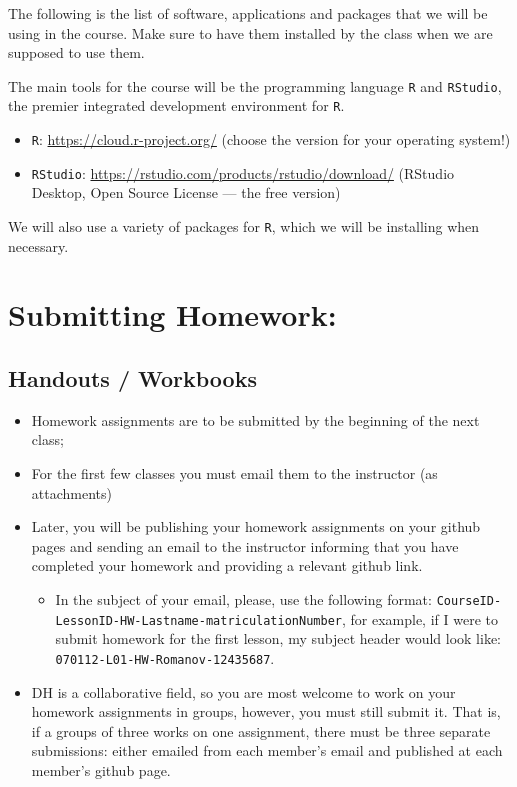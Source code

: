 \documentclass[
]{book}
\providecommand{\tightlist}{%
  \setlength{\itemsep}{0pt}\setlength{\parskip}{0pt}}
\begin{document}
The following is the list of software, applications and packages that we will be using in the course. Make sure to have them installed by the class when we are supposed to use them.

The main tools for the course will be the programming language \texttt{R} and \texttt{RStudio}, the premier integrated development environment for \texttt{R}.

\begin{itemize}
\tightlist
\item
  \texttt{R}: \url{https://cloud.r-project.org/} (choose the version for your operating system!)
\item
  \texttt{RStudio}: \url{https://rstudio.com/products/rstudio/download/} (RStudio Desktop, Open Source License --- the free version)
\end{itemize}

We will also use a variety of packages for \texttt{R}, which we will be installing when necessary.

\hypertarget{submitting-homework}{%
\section{Submitting Homework:}\label{submitting-homework}}

\hypertarget{handouts-workbooks}{%
\subsection{Handouts / Workbooks}\label{handouts-workbooks}}

\begin{itemize}
\tightlist
\item
  Homework assignments are to be submitted by the beginning of the next class;
\item
  For the first few classes you must email them to the instructor (as attachments)
\item
  Later, you will be publishing your homework assignments on your github pages and sending an email to the instructor informing that you have completed your homework and providing a relevant github link.

  \begin{itemize}
  \tightlist
  \item
    In the subject of your email, please, use the following format: \texttt{CourseID-LessonID-HW-Lastname-matriculationNumber}, for example, if I were to submit homework for the first lesson, my subject header would look like: \texttt{070112-L01-HW-Romanov-12435687}.
  \end{itemize}
\item
  DH is a collaborative field, so you are most welcome to work on your homework assignments in groups, however, you must still submit it. That is, if a groups of three works on one assignment, there must be three separate submissions: either emailed from each member's email and published at each member's github page.
\end{itemize}
\end{document}
